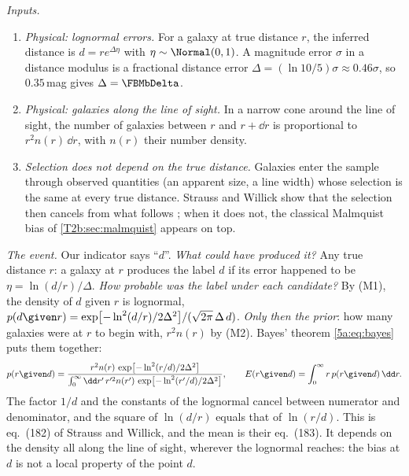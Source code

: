 \emph{Inputs.}
\begin{enumerate}[label=(M\arabic*),leftmargin=2.6em,itemsep=1pt]
  \item \emph{Physical: lognormal errors.} For a galaxy at true distance $r$, the
        inferred distance is $d=re^{\Delta\eta}$ with $\eta\sim\Normal(0,1)$. A magnitude
        error $\sigma$ in a distance modulus is a fractional distance error
        $\Delta=(\ln10/5)\sigma\approx0.46\sigma$, so $0.35$\,mag gives $\Delta=\FBMbDelta$.
  \item \emph{Physical: galaxies along the line of sight.} In a narrow cone around
        the line of sight, the number of galaxies between $r$ and $r+\dd r$ is
        proportional to $r^2n(r)\,\dd r$, with $n(r)$ their number density.
  \item \emph{Selection does not depend on the true distance.} Galaxies enter the
        sample through observed quantities (an apparent size, a line width) whose
        selection is the same at every true distance. Strauss and Willick show that
        the selection then cancels from what follows \cite[Sec.~6.5.2]{StraussWillick1995};
        when it does not, the classical Malmquist bias of \cref{T2b:sec:malmquist}
        appears on top.
\end{enumerate}

\emph{The event.} Our indicator says ``$d$''. \emph{What could have produced it?}
Any true distance $r$: a galaxy at $r$ produces the label $d$ if its error happened
to be $\eta=\ln(d/r)/\Delta$. \emph{How probable was the label under each candidate?}
By (M1), the density of $d$ given $r$ is lognormal,
$p(d\given r)=\exp\bigl[-\ln^2(d/r)/2\Delta^2\bigr]/(\sqrt{2\pi}\,\Delta\,d)$. \emph{Only
then the prior}: how many galaxies were at $r$ to begin with, $r^2n(r)$ by (M2). Bayes'
theorem \eqref{5a:eq:bayes} puts them together:
\begin{equation}
  p(r\given d)=\frac{r^2n(r)\,\exp\bigl[-\ln^2(r/d)/2\Delta^2\bigr]}
                    {\int_0^\infty\dd r'\,r'^2n(r')\,\exp\bigl[-\ln^2(r'/d)/2\Delta^2\bigr]},
  \qquad
  E(r\given d)=\int_0^\infty r\,p(r\given d)\,\dd r .
  \label{11c:eq:ihm-exact}
\end{equation}
The factor $1/d$ and the constants of the lognormal cancel between numerator and
denominator, and the square of $\ln(d/r)$ equals that of $\ln(r/d)$. This is
eq.~(182) of Strauss and Willick, and the mean is their eq.~(183). It depends on the
density all along the line of sight, wherever the lognormal reaches: the bias at $d$
is not a local property of the point $d$.

